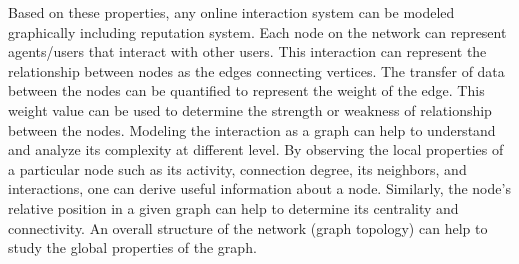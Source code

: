 Based on these properties, any online interaction system can be modeled
graphically including reputation system. Each node on the network can represent
agents/users that interact with other users. This interaction can represent the
relationship between nodes as the edges connecting vertices. The transfer of
data between the nodes can be quantified to represent the weight of the edge.
This weight value can be used to determine the strength or weakness of
relationship between the nodes. Modeling the interaction as a graph can help
to understand and analyze its complexity at different level. By observing the
local properties of a particular node such as its activity, connection degree,
its neighbors, and interactions, one can derive useful information about a node.
Similarly, the node's relative position in a given graph can help to determine
its centrality and connectivity. An overall structure of the network (graph
topology) can help to study the global properties of the graph. 

